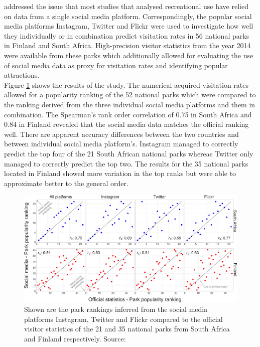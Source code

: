 \textcite{Tenkanen2017} addressed the issue that most studies that analysed recreational use have relied on data from a single social media platform. Correspondingly, the popular social media platforms Instagram, Twitter and Flickr were used to investigate how well they individually or in combination predict visitation rates in 56 national parks in Finland and South Africa. High-precision visitor statistics from the year 2014 were available from these parks which additionally allowed for evaluating the use of social media data as proxy for visitation rates and identifying popular attractions.\\
Figure \ref{fig:tenkanen_SMP} shows the results of the study. The numerical acquired visitation rates allowed for a popularity ranking of the 52 national parks which were compared to the ranking derived from the three individual social media platforms and them in combination. The Spearman's rank order correlation of 0.75 in South Africa and 0.84 in Finland revealed that the social media data matches the official ranking well. There are apparent accuracy differences between the two countries and between individual social media platform's. Instagram managed to correctly predict the top four of the 21 South African national parks whereas Twitter only managed to correctly predict the top two. The results for the 35 national parks located in Finland showed more variation in the top ranks but were able to approximate better to the general order.

\begin{figure}[h]
   \centering
   \includegraphics[width=\textwidth]{img/tenkanen_2017_SMPs.pdf}
   \caption{Shown are the park rankings inferred from the social media platforms Instagram, Twitter and Flickr compared to the official visitor statistics of the 21 and 35 national parks from South Africa and Finland respectively. Source: \textcite[p.4]{Tenkanen2017}}
   \label{fig:tenkanen_SMP}
\end{figure}


